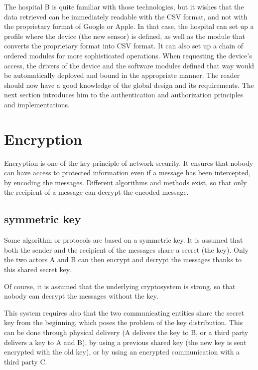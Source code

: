 The hospital B is quite familiar with those technologies, but it wishes that the data retrieved can be immediately readable with the CSV format, and not with the proprietary format of Google or Apple. In that case, the hospital can set up a profile where the device (the new sensor) is defined, as well as the module that converts the proprietary format into CSV format. It can also set up a chain of ordered modules for more sophisticated operations. When requesting the device's access, the drivers of the device and the software modules defined that way would be automatically deployed and bound in the appropriate manner.
\linebreak
\linebreak
\linebreak
The reader should now have a good knowledge of the global design and its requirements. The next section introduces him to the authentication and authorization principles and implementations.

\section{Encryption}
Encryption is one of the key principle of network security. It ensures that nobody can have access to protected information even if a message has been intercepted, by encoding the messages. Different algorithms and methods exist, so that only the recipient of a message can decrypt the encoded message.

\subsection{symmetric key}
\label{sec:02_symmetric_keys}
Some algorithm or protocols are based on a symmetric key. It is assumed that both the sender and the recipient of the messages share a secret (the key). Only the two actors A and B can then encrypt and decrypt the messages thanks to this shared secret key.

Of course, it is assumed that the underlying cryptosystem is strong, so that nobody can decrypt the messages without the key.

This system requires also that the two communicating entities share the secret key from the beginning, which poses the problem of the key distribution. This can be done through physical delivery (A delivers the key to B, or a third party delivers a key to A and B), by using a previous shared key (the new key is sent encrypted with the old key), or by using an encrypted communication with a third party C.
 
